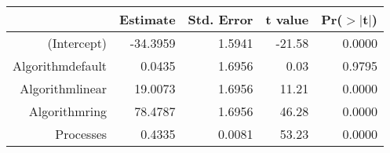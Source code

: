 \begin{tabular}{rrrrr}
  \hline
 & Estimate & Std. Error & t value & Pr($>$$|$t$|$) \\ 
  \hline
(Intercept) & -34.3959 & 1.5941 & -21.58 & 0.0000 \\ 
  Algorithmdefault & 0.0435 & 1.6956 & 0.03 & 0.9795 \\ 
  Algorithmlinear & 19.0073 & 1.6956 & 11.21 & 0.0000 \\ 
  Algorithmring & 78.4787 & 1.6956 & 46.28 & 0.0000 \\ 
  Processes & 0.4335 & 0.0081 & 53.23 & 0.0000 \\ 
   \hline
\end{tabular}
